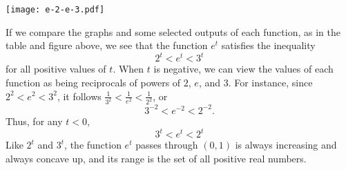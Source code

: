 \documentclass[nooutcomes]{ximera}
\begin{document}

\begin{image}
\texttt{[image: e-2-e-3.pdf]}
\end{image}

If we compare the graphs and some selected outputs of each function, as in the table and figure above, we see that the function $e^t$ satisfies the inequality%
\begin{equation*}
2^t < e^t < 3^t
\end{equation*}
for all positive values of $t$.  When $t$ is negative, we can view the values of each function as being reciprocals of powers of $2$, $e$, and $3$.  For instance, since $2^2 < e^2 < 3^2$, it follows $\frac{1}{3^2} < \frac{1}{e^2} < \frac{1}{2^2}$, or%
\begin{equation*}
3^{-2} < e^{-2} < 2^{-2}\text{.}
\end{equation*}
Thus, for any $t < 0$,%
\begin{equation*}
3^t < e^t < 2^t
\end{equation*}
Like $2^t$ and $3^t$, the function $e^t$ passes through $(0,1)$ is always increasing and always concave up, and its range is the set of all positive real numbers.
\end{document}
